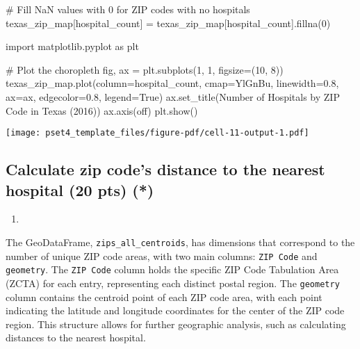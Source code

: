 \documentclass[
  letterpaper,
  DIV=11,
  numbers=noendperiod]{scrartcl}
\newenvironment{Shaded}{\begin{snugshade}}{\end{snugshade}}
\newcommand{\CommentTok}[1]{\textcolor[rgb]{0.37,0.37,0.37}{#1}}
\newcommand{\DecValTok}[1]{\textcolor[rgb]{0.68,0.00,0.00}{#1}}
\newcommand{\FloatTok}[1]{\textcolor[rgb]{0.68,0.00,0.00}{#1}}
\newcommand{\ImportTok}[1]{\textcolor[rgb]{0.00,0.46,0.62}{#1}}
\newcommand{\NormalTok}[1]{\textcolor[rgb]{0.00,0.23,0.31}{#1}}
\newcommand{\OperatorTok}[1]{\textcolor[rgb]{0.37,0.37,0.37}{#1}}
\newcommand{\StringTok}[1]{\textcolor[rgb]{0.13,0.47,0.30}{#1}}
\newcommand{\VariableTok}[1]{\textcolor[rgb]{0.07,0.07,0.07}{#1}}
\providecommand{\tightlist}{%
  \setlength{\itemsep}{0pt}\setlength{\parskip}{0pt}}\usepackage{longtable,booktabs,array}
\begin{document}
\begin{Shaded}
\begin{Highlighting}[]
\CommentTok{\# Fill NaN values with 0 for ZIP codes with no hospitals}
\NormalTok{texas\_zip\_map[}\StringTok{\textquotesingle{}hospital\_count\textquotesingle{}}\NormalTok{] }\OperatorTok{=}\NormalTok{ texas\_zip\_map[}\StringTok{\textquotesingle{}hospital\_count\textquotesingle{}}\NormalTok{].fillna(}\DecValTok{0}\NormalTok{)}

\ImportTok{import}\NormalTok{ matplotlib.pyplot }\ImportTok{as}\NormalTok{ plt}

\CommentTok{\# Plot the choropleth}
\NormalTok{fig, ax }\OperatorTok{=}\NormalTok{ plt.subplots(}\DecValTok{1}\NormalTok{, }\DecValTok{1}\NormalTok{, figsize}\OperatorTok{=}\NormalTok{(}\DecValTok{10}\NormalTok{, }\DecValTok{8}\NormalTok{))}
\NormalTok{texas\_zip\_map.plot(column}\OperatorTok{=}\StringTok{\textquotesingle{}hospital\_count\textquotesingle{}}\NormalTok{, cmap}\OperatorTok{=}\StringTok{\textquotesingle{}YlGnBu\textquotesingle{}}\NormalTok{, linewidth}\OperatorTok{=}\FloatTok{0.8}\NormalTok{, ax}\OperatorTok{=}\NormalTok{ax, edgecolor}\OperatorTok{=}\StringTok{\textquotesingle{}0.8\textquotesingle{}}\NormalTok{, legend}\OperatorTok{=}\VariableTok{True}\NormalTok{)}
\NormalTok{ax.set\_title(}\StringTok{\textquotesingle{}Number of Hospitals by ZIP Code in Texas (2016)\textquotesingle{}}\NormalTok{)}
\NormalTok{ax.axis(}\StringTok{\textquotesingle{}off\textquotesingle{}}\NormalTok{)}
\NormalTok{plt.show()}
\end{Highlighting}
\end{Shaded}

\texttt{[image: pset4\_template\_files/figure-pdf/cell-11-output-1.pdf]}

\subsection{Calculate zip code's distance to the nearest hospital (20
pts)
(*)}\label{calculate-zip-codes-distance-to-the-nearest-hospital-20-pts}

\begin{enumerate}
\def\labelenumi{\arabic{enumi}.}
\tightlist
\item
\end{enumerate}

The GeoDataFrame, \texttt{zips\_all\_centroids}, has dimensions that
correspond to the number of unique ZIP code areas, with two main
columns: \texttt{ZIP\ Code} and \texttt{geometry}. The
\texttt{ZIP\ Code} column holds the specific ZIP Code Tabulation Area
(ZCTA) for each entry, representing each distinct postal region. The
\texttt{geometry} column contains the centroid point of each ZIP code
area, with each point indicating the latitude and longitude coordinates
for the center of the ZIP code region. This structure allows for further
geographic analysis, such as calculating distances to the nearest
hospital.
\end{document}

